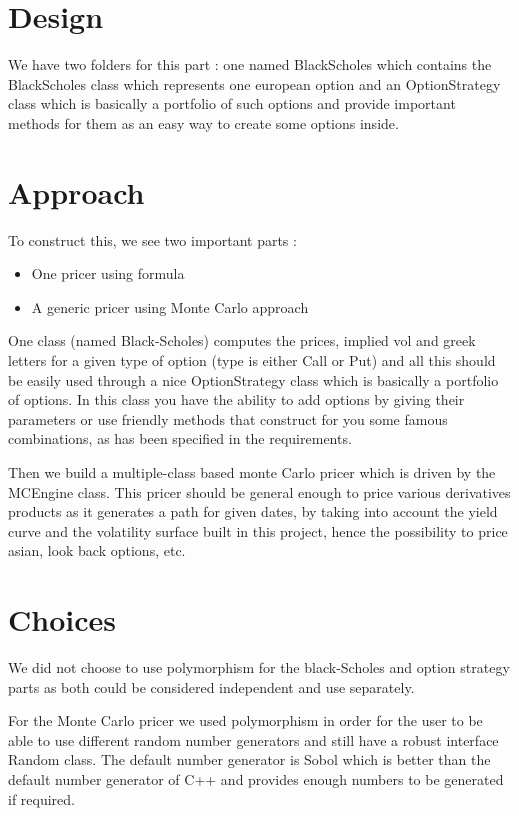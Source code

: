 \section{Design }

We have two folders for this part : one named BlackScholes which contains
the BlackScholes class which represents one european option and an OptionStrategy class
which is basically a portfolio of such options and provide important methods for them
as an easy way to create some options inside.


\section{Approach}
To construct this, we see two important parts :
\begin{itemize}
    \item One pricer using formula
    \item A generic pricer using Monte Carlo approach
\end{itemize}

One class (named Black-Scholes) computes the prices, implied vol and
greek letters for a given type of option (type is either Call or
Put) and all this should be easily used through a nice
OptionStrategy class which is basically a portfolio of options. In
this class you have the ability to add options by giving their
parameters or use friendly methods that construct for you some
famous combinations, as has been specified in the requirements.

Then we build a multiple-class based monte Carlo pricer which is
driven by the MCEngine class. This pricer should be general enough
to price various derivatives products as it generates a path for
given dates, by taking into account the yield curve and the
volatility surface built in this project, hence the possibility to
price asian, look back options, etc.


\section{Choices}
\par We did not choose to use polymorphism for the black-Scholes and
option strategy parts as both could be considered independent and
use separately.

\par For the Monte Carlo pricer we used polymorphism in order for the user
to be able to use different random number generators and still have
a robust interface Random class. The default number generator is
Sobol which is better than the default number generator of C++ and
provides enough numbers to be generated if required.

